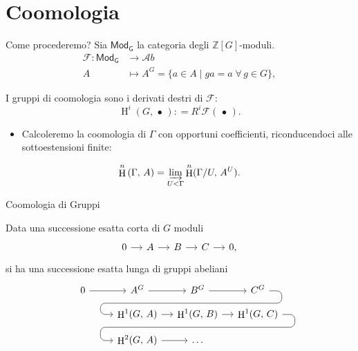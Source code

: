 \documentclass{beamer}
\newcommand{\Z}{\mathbb{Z}}
\DeclareMathOperator{\HH}{H}
\newcommand{\Gmod}{\mathsf{Mod}_\mathsf{G}}
\begin{document}
\section{Coomologia}
\begin{frame}{Come procederemo?}
Sia $ \Gmod $ la categoria degli $ \Z[G] $-moduli.
\begin{align*} 
\mathcal{F} \colon \Gmod &\to \mathcal{A}b \\
A &\mapsto A^G = \{ a \in A \mid ga = a \; \forall \, g \in G \},
\end{align*}

\begin{definition}
	I gruppi di coomologia sono i derivati destri di $ \mathcal{F} $:
	\[ \HH^i(G, \, \bullet\,) : = R^i\mathcal{F}(\,\bullet\,). \]
\end{definition}


\begin{itemize}
	\item Calcoleremo la coomologia di $ \Gamma $ con opportuni coefficienti,
	riconducendoci alle sottoestensioni finite:
\end{itemize}
\[ \HH^n \left(\Gamma, \, A \right)  = \varinjlim_{U < \Gamma} \HH^n(\Gamma/U, \, A^U). \]

\end{frame}

\begin{frame}[fragile]{Coomologia di Gruppi}
\begin{theorem}\label{fond}
Data una successione esatta corta di $ G $ moduli
\[\begin{tikzcd}[column sep = small]
0 \rar & A \rar & B \rar & C \rar & 0,
\end{tikzcd}\]
si ha una successione esatta lunga di gruppi abeliani
\[\begin{tikzcd}[column sep = small, row sep = small]
0 \rar
&A^G \rar\arrow[d,phantom, ""{coordinate, name=A, near end}]
& B^G \arrow[d,phantom, ""{coordinate, name=B}] \rar
& C^G \arrow[dll, 
rounded corners = 5 pt, 
to path={ --([xshift=3ex]\tikztostart.east)
	|- (A)\tikztonodes
	-| ([xshift=-3ex]\tikztotarget.west)
	-- (\tikztotarget)}]  \\
\qquad \quad
&\HH^1(G, \, A)  \arrow[d,phantom, ""{coordinate, name=X}] \rar 
& \HH^1(G, \, B) \arrow[d,phantom, ""{coordinate, name=Y}] \rar
& \HH^1(G, \, C) \arrow[d,phantom, ""{coordinate, name=Z}] \arrow[dll, 
rounded corners = 5 pt, 
to path={ --([xshift=3ex]\tikztostart.east)
	|- (X)\tikztonodes
	-| ([xshift=-3ex]\tikztotarget.west)
	-- (\tikztotarget)}]  \\
&\HH^2(G, \, A) \rar
& \dots
& \qquad \end{tikzcd}\]
\end{theorem}
\end{frame}
\end{document}
